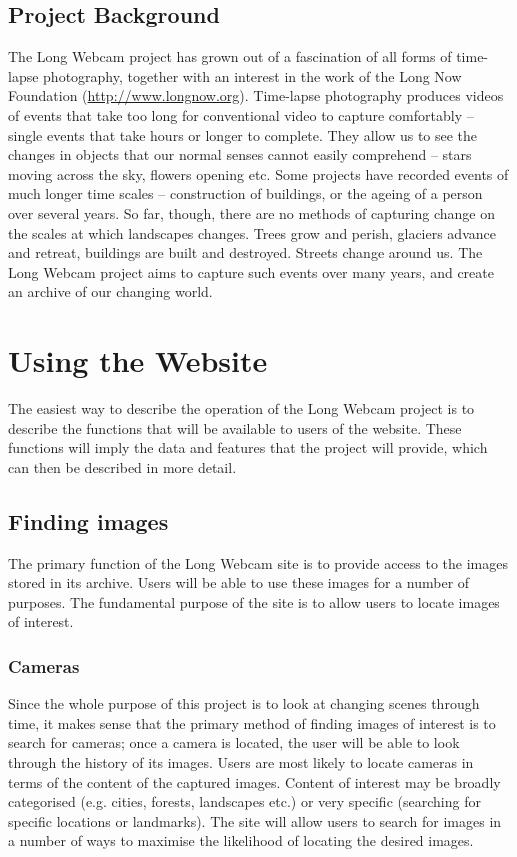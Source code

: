 \documentclass[11pt,a4paper]{article}
\begin{document}
\subsection{Project Background}
The Long Webcam project has grown out of a fascination of all forms of time-lapse photography, together with an interest in the work of the Long Now Foundation (\url{http://www.longnow.org}). Time-lapse photography produces videos of events that take too long for conventional video to capture comfortably – single events that take hours or longer to complete. They allow us to see the changes in objects that our normal senses cannot easily comprehend – stars moving across the sky, flowers opening etc.
Some projects have recorded events of much longer time scales – construction of buildings, or the ageing of a person over several years. So far, though, there are no methods of capturing change on the scales at which landscapes changes. Trees grow and perish, glaciers advance and retreat, buildings are built and destroyed. Streets change around us. The Long Webcam project aims to capture such events over many years, and create an archive of our changing world.

\clearpage
\section{Using the Website}
The easiest way to describe the operation of the Long Webcam project is to describe the functions that will be available to users of the website. These functions will imply the data and features that the project will provide, which can then be described in more detail.

\subsection{Finding images}
The primary function of the Long Webcam site is to provide access to the images stored in its archive. Users will be able to use these images for a number of purposes. The fundamental purpose of the site is to allow users to locate images of interest.

\subsubsection{Cameras}
Since the whole purpose of this project is to look at changing scenes through time, it makes sense that the primary method of finding images of interest is to search for cameras; once a camera is located, the user will be able to look through the history of its images. Users are most likely to locate cameras in terms of the content of the captured images. Content of interest may be broadly categorised (e.g. cities, forests, landscapes etc.) or very specific (searching for specific locations or landmarks). The site will allow users to search for images in a number of ways to maximise the likelihood of locating the desired images.
\end{document}
